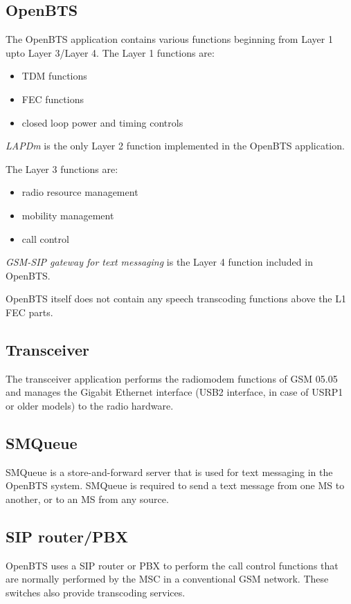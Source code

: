 \subsection{OpenBTS}
The OpenBTS application contains various functions beginning from Layer 1 upto
Layer 3/Layer 4. The Layer 1 functions are:
\begin{itemize}
\item TDM functions
\item FEC functions
\item closed loop power and timing controls
\end{itemize}

\emph{LAPDm} is the only Layer 2 function implemented in the OpenBTS 
application.

The Layer 3 functions are:
\begin{itemize}
\item radio resource management
\item mobility management
\item call control
\end{itemize}

\emph{GSM-SIP gateway for text messaging} is the Layer 4 function included
in OpenBTS.

OpenBTS itself does not contain any speech transcoding
functions above the L1 FEC parts.


\subsection{Transceiver}
The transceiver application performs the radiomodem functions of GSM 05.05 and manages 
the Gigabit Ethernet interface
(USB2 interface, in case
of USRP1 or older models) to the radio hardware.

\subsection{SMQueue}
SMQueue is a store-and-forward server that is used for 
text messaging in the OpenBTS system. SMQueue is required to send 
a text message from one MS to another, or to an MS from any source.

\subsection{SIP router/PBX}

OpenBTS uses a SIP router or PBX to perform the 
call control functions that are normally performed by the MSC
in a conventional GSM network. These switches also provide transcoding 
services.

